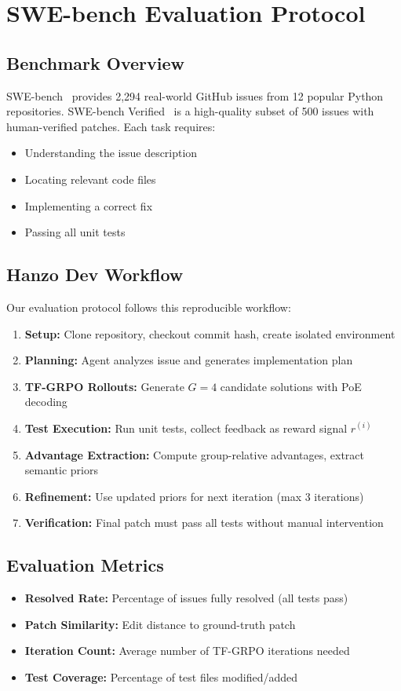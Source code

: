 \section{SWE-bench Evaluation Protocol}
\subsection{Benchmark Overview}
SWE-bench~\cite{jimenez2024swebench} provides 2,294 real-world GitHub issues from 12 popular Python repositories. SWE-bench Verified~\cite{openai2024swebench-verified} is a high-quality subset of 500 issues with human-verified patches. Each task requires:
\begin{itemize}[leftmargin=1.1em]
  \item Understanding the issue description
  \item Locating relevant code files
  \item Implementing a correct fix
  \item Passing all unit tests
\end{itemize}

\subsection{Hanzo Dev Workflow}
Our evaluation protocol follows this reproducible workflow:
\begin{enumerate}
  \item \textbf{Setup:} Clone repository, checkout commit hash, create isolated environment
  \item \textbf{Planning:} Agent analyzes issue and generates implementation plan
  \item \textbf{TF-GRPO Rollouts:} Generate \(G=4\) candidate solutions with PoE decoding
  \item \textbf{Test Execution:} Run unit tests, collect feedback as reward signal \(r^{(i)}\)
  \item \textbf{Advantage Extraction:} Compute group-relative advantages, extract semantic priors
  \item \textbf{Refinement:} Use updated priors for next iteration (max 3 iterations)
  \item \textbf{Verification:} Final patch must pass all tests without manual intervention
\end{enumerate}

\subsection{Evaluation Metrics}
\begin{itemize}[leftmargin=1.1em]
  \item \textbf{Resolved Rate:} Percentage of issues fully resolved (all tests pass)
  \item \textbf{Patch Similarity:} Edit distance to ground-truth patch
  \item \textbf{Iteration Count:} Average number of TF-GRPO iterations needed
  \item \textbf{Test Coverage:} Percentage of test files modified/added
\end{itemize}

